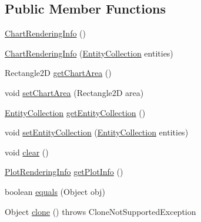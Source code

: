 \subsection*{Public Member Functions}
\begin{DoxyCompactItemize}
\item 
\mbox{\hyperlink{classorg_1_1jfree_1_1chart_1_1_chart_rendering_info_aad79afd960519b122dd46da5cb9e4c40}{Chart\+Rendering\+Info}} ()
\item 
\mbox{\hyperlink{classorg_1_1jfree_1_1chart_1_1_chart_rendering_info_af0e12c776e631f426b271ccf75653ce2}{Chart\+Rendering\+Info}} (\mbox{\hyperlink{interfaceorg_1_1jfree_1_1chart_1_1entity_1_1_entity_collection}{Entity\+Collection}} entities)
\item 
Rectangle2D \mbox{\hyperlink{classorg_1_1jfree_1_1chart_1_1_chart_rendering_info_aa1fcdd48a4c2ab12d8bd808401185c9b}{get\+Chart\+Area}} ()
\item 
void \mbox{\hyperlink{classorg_1_1jfree_1_1chart_1_1_chart_rendering_info_abb45f3508efa2ad07500a048dd3eabe4}{set\+Chart\+Area}} (Rectangle2D area)
\item 
\mbox{\hyperlink{interfaceorg_1_1jfree_1_1chart_1_1entity_1_1_entity_collection}{Entity\+Collection}} \mbox{\hyperlink{classorg_1_1jfree_1_1chart_1_1_chart_rendering_info_af353145dd9f3c18dba7e344f02303136}{get\+Entity\+Collection}} ()
\item 
void \mbox{\hyperlink{classorg_1_1jfree_1_1chart_1_1_chart_rendering_info_ace7a3e8216473d9d758e99924043d545}{set\+Entity\+Collection}} (\mbox{\hyperlink{interfaceorg_1_1jfree_1_1chart_1_1entity_1_1_entity_collection}{Entity\+Collection}} entities)
\item 
void \mbox{\hyperlink{classorg_1_1jfree_1_1chart_1_1_chart_rendering_info_a7b6bba7eab1a5c9dd0bb5d45f18b8801}{clear}} ()
\item 
\mbox{\hyperlink{classorg_1_1jfree_1_1chart_1_1plot_1_1_plot_rendering_info}{Plot\+Rendering\+Info}} \mbox{\hyperlink{classorg_1_1jfree_1_1chart_1_1_chart_rendering_info_afe705ff9a7514ce7d8b424c6affc21f4}{get\+Plot\+Info}} ()
\item 
boolean \mbox{\hyperlink{classorg_1_1jfree_1_1chart_1_1_chart_rendering_info_a5578f75ce9a6917b63eb802fb9200555}{equals}} (Object obj)
\item 
Object \mbox{\hyperlink{classorg_1_1jfree_1_1chart_1_1_chart_rendering_info_a3b2c7bc5c9db5f825fa45541d7eca7e1}{clone}} ()  throws Clone\+Not\+Supported\+Exception 
\end{DoxyCompactItemize}


